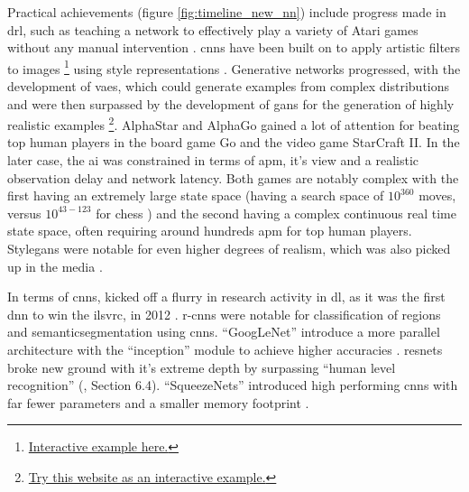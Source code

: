 Practical achievements (figure \ref{fig:timeline_new_nn}) include progress made in \gls{drl}, such as teaching a network to effectively play a variety of Atari games without any manual intervention \cite{drl_atari}. \gls{cnn}s have been built on to apply artistic filters to images \footnote{\href{https://deepart.io/}{Interactive example here.}} using style representations \cite{neural_style}. Generative networks progressed, with the development of \gls{vae}s, which could generate examples from complex distributions and were then surpassed by the development of \gls{gan}s for the generation of highly realistic examples \cite{gans}\footnote{\href{http://www.whichfaceisreal.com/index.php}{Try this website as an interactive example.}}. AlphaStar \cite{alphastar} and AlphaGo \cite{alphago} gained a lot of attention \cite{press_alpha_go} \cite{press_alpha_star} for beating top human players in the board game Go and the video game StarCraft II. In the later case, the \gls{ai} was constrained in terms of \gls{apm}, it's view and a realistic observation delay and network latency. Both games are notably complex with the first having an extremely large state space (having a search space of $10^360$ moves, versus $10^{43-123}$ for chess \cite{moves_chess_go}) and the second having a complex continuous real time state space, often requiring  around hundreds \gls{apm} for top human players. Style\gls{gan}s were notable for even higher degrees of realism, which was also picked up in the media \cite{press_stylegan}.
\bigskip

In terms of \gls{cnn}s, kicked off a flurry in research activity in \gls{dl}, as it was the first \gls{dnn} to win the \gls{ilsvrc}, in 2012 \cite{alex_net} \cite{dl_overview}. \gls{r-cnn}s were notable for classification of regions and \gls{semanticsegmentation} using \gls{cnn}s. \enquote{GoogLeNet} introduce a more parallel architecture with the \enquote{inception} module to achieve higher accuracies \cite{googlenet}. \gls{resnet}s broke new ground with it's extreme depth \cite{resnet} by surpassing \enquote{human level recognition} (\cite{resnet_human}, Section 6.4). \enquote{SqueezeNets} introduced high performing \gls{cnn}s with far fewer parameters and a smaller memory footprint \cite{squeeze_net}. 
\bigskip

